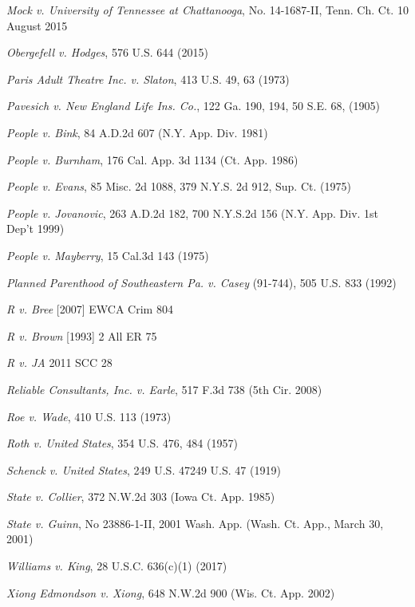 \documentclass[paper=a4,book,openany]{jlreq}
\newenvironment{mylist}{\small \list{}{}{}   \itemindent=-1\zw}{\endlist}
\begin{document}
\begin{mylist}
\item \emph{Mock v. University of Tennessee at Chattanooga}, No. 14-1687-II, Tenn. Ch. Ct. 10 August 2015
\item \emph{Obergefell v. Hodges}, 576 U.S. 644 (2015)
\item \emph{Paris Adult Theatre Inc. v. Slaton}, 413 U.S. 49, 63 (1973)
\item \emph{Pavesich v. New England Life Ins. Co.}, 122 Ga. 190, 194, 50 S.E. 68, (1905)
\item \emph{People v. Bink}, 84 A.D.2d 607 (N.Y. App. Div. 1981)
\item \emph{People v. Burnham}, 176 Cal. App. 3d 1134 (Ct. App. 1986)
\item \emph{People v. Evans}, 85 Misc. 2d 1088, 379 N.Y.S. 2d 912, Sup. Ct. (1975)
\item \emph{People v. Jovanovic},  263 A.D.2d 182, 700 N.Y.S.2d 156 (N.Y. App. Div. 1st Dep't 1999)
\item \emph{People v. Mayberry}, 15 Cal.3d 143  (1975)
\item \emph{Planned Parenthood of Southeastern Pa. v. Casey} (91-744), 505 U.S. 833 (1992)
\item \emph{R v. Bree} [2007] EWCA Crim 804
\item \emph{R v. Brown} [1993] 2 All ER 75
\item \emph{R v. JA} 2011 SCC 28
\item \emph{Reliable Consultants, Inc. v. Earle}, 517 F.3d 738 (5th Cir. 2008)
\item \emph{Roe v. Wade}, 410 U.S. 113 (1973)
\item \emph{Roth v. United States}, 354 U.S. 476, 484 (1957)
\item \emph{Schenck v. United States}, 249 U.S. 47249 U.S. 47 (1919)
\item \emph{State v. Collier}, 372 N.W.2d 303 (Iowa Ct. App. 1985)
\item \emph{State v. Guinn}, No 23886-1-II, 2001 Wash. App. (Wash. Ct. App., March 30, 2001)
\item \emph{Williams v. King}, 28 U.S.C. 636(c)(1) (2017)
\item \emph{Xiong Edmondson v. Xiong}, 648 N.W.2d 900 (Wis. Ct. App. 2002)
  \end{mylist}

  
{\footnotesize
\printindex
}
\end{document}
